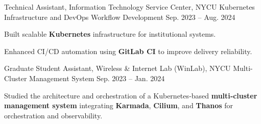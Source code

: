 \begin{cventries}
  \cventry
  {Technical Assistant, Information Technology Service Center, NYCU} %
  {Kubernetes Infrastructure and DevOps Workflow Development} %
  {} %
  {Sep. 2023 -- Aug. 2024} %
  {
    \begin{cvitems}
      \item {Built scalable \textbf{Kubernetes} infrastructure for institutional systems.}
      \item {Enhanced CI/CD automation using \textbf{GitLab CI} to improve delivery reliability.}
    \end{cvitems}
  }

  
  \cventry
    {Graduate Student Assistant, Wireless \& Internet Lab (WinLab), NYCU} %
    {Multi-Cluster Management System} %
    {} %
    {Sep. 2023 -- Jan. 2024} %
    {
      \begin{cvitems}
        \item {Studied the architecture and orchestration of a Kubernetes‑based \textbf{multi‑cluster management system} integrating
\textbf{Karmada}, \textbf{Cilium}, and \textbf{Thanos} for orchestration and observability.}
      \end{cvitems}
    }

    
 
\end{cventries}
